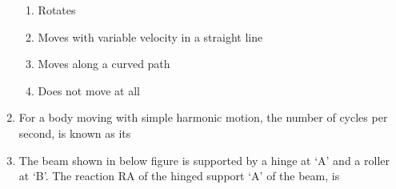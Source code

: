 \documentclass[11pt,a4paper]{article}
\begin{document}
\begin{enumerate}
\begin{enumerate}[label=\Alph*.]
\item{Rotates}
\item{Moves with variable velocity in a straight line}
\item{Moves along a curved path}
\item{Does not move at all}
\end{enumerate}
\item{For a body moving with simple harmonic motion, the number of cycles per second, is known as its}
\\
\item{The beam shown in below figure is supported by a hinge at `A' and a roller at `B'. The reaction RA of the hinged support `A' of the beam, is \\

}
\end{enumerate}
\end{document}
